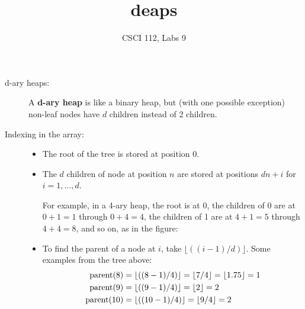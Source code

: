 \documentclass{article}
\title{deaps}
\author{CSCI 112, Labs 9}
\date{}
\newcommand{\id}[1]{\makebox{#1}}
\begin{document}
\sloppy

\maketitle


\begin{description}
\item[d-ary heaps:]

 A \textbf{d-ary heap} is like a binary heap, but (with one possible
 exception) non-leaf nodes have $d$ children instead of 2 children.
\item[Indexing in the array:]

   \begin{itemize}
     \item
       The root of the tree is stored at position 0.
     \item 
       The $d$ children of node at position $n$ are stored at positions
       $dn + i$ for $i= 1,\ldots, d$.

       For example, in a 4-ary heap, the root is at 0, the children of
       0 are at $0+1 = 1$ through $0+4=4$, the children of 1 are
       at $4+1=5$ through $4+4=8$, and so on, as in the
       figure:


\item To find the parent of a node at $i$, take
  $\lfloor((i-1)/d)\rfloor$.  Some examples from the tree above:
  \begin{align*}
    \id{parent}(8) &=   \lfloor((8-1)/4)\rfloor =
     \lfloor 7/4 \rfloor =     \lfloor 1.75\rfloor =
    1\\
\id{parent}(9) &=   \lfloor((9-1)/4)\rfloor = \lfloor 2\rfloor = 2\\
\id{parent}(10) &=   \lfloor((10-1)/4)\rfloor = \lfloor 9/4 \rfloor = 2
  \end{align*}


\end{itemize}
\end{description}
\end{document}
